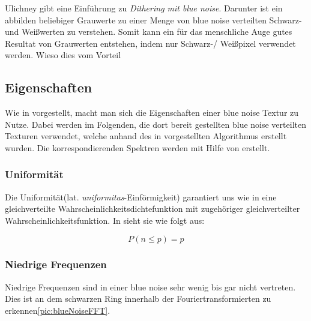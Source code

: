 
\cite{3288}Ulichney gibt eine Einführung zu \textit{Dithering mit blue noise}. Darunter ist ein abbilden
beliebiger Grauwerte zu einer Menge von blue noise verteilten Schwarz- und Weißwerten zu verstehen.
Somit kann ein für das menschliche Auge gutes Resultat von Grauwerten entstehen, indem nur Schwarz-/
Weißpixel verwendet werden. Wieso dies vom Vorteil 


\subsection{Eigenschaften}

Wie in \cite{Pet17} vorgestellt, macht man sich die Eigenschaften einer
blue noise Textur zu Nutze. Dabei werden im Folgenden, die dort bereit 
gestellten blue noise verteilten Texturen verwendet, welche anhand des in
\cite{ulichney1993void} vorgestellten Algorithmus erstellt wurden.
Die korrespondierenden Spektren werden mit Hilfe von \cite{FFTProgWeb} erstellt.

\subsubsection{Uniformität}
Die Uniformität(lat. \textit{uniformitas}-Einförmigkeit) garantiert uns 
wie in \cite{3288} eine gleichverteilte Wahrscheinlichkeitsdichtefunktion
mit zugehöriger gleichverteilter Wahrscheinlichkeitsfunktion. In \cite{Pet17}
sieht sie wie folgt aus: 

\begin{equation}\label{eq:uniformität}
    P(n \leq p) = p
\end{equation}

\cite{kiencke2009signale}

\subsubsection{Niedrige Frequenzen}
Niedrige Frequenzen sind in einer blue noise sehr wenig bis gar nicht 
vertreten. Dies ist an dem schwarzen Ring innerhalb der Fouriertransformierten
zu erkennen\ref{pic:blueNoiseFFT}.

